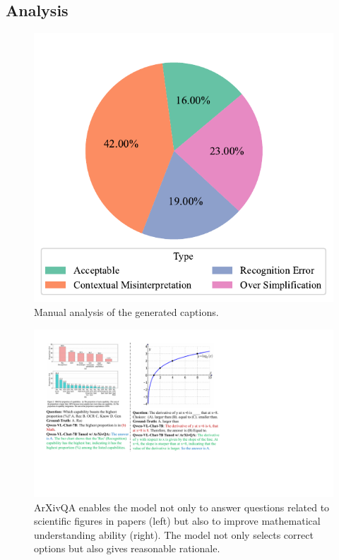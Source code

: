 
\subsection{Analysis}

\begin{figure}
    \centering
\includegraphics[width=0.8\linewidth]{figs/pie_chart.pdf}
    \caption{Manual analysis of the generated captions. }
    \label{fig:error_pie_chart}
\end{figure}


\begin{figure}
    \centering
    \includegraphics[width=0.62\linewidth]{figs/mathvista_case_study_v2.pdf}
    \caption{ArXivQA enables the model not only to answer questions related to scientific figures in papers (left) but also to improve mathematical understanding ability (right). The model not only selects correct options but also gives reasonable rationale.}
    \label{fig:math_case_study}
\end{figure}

